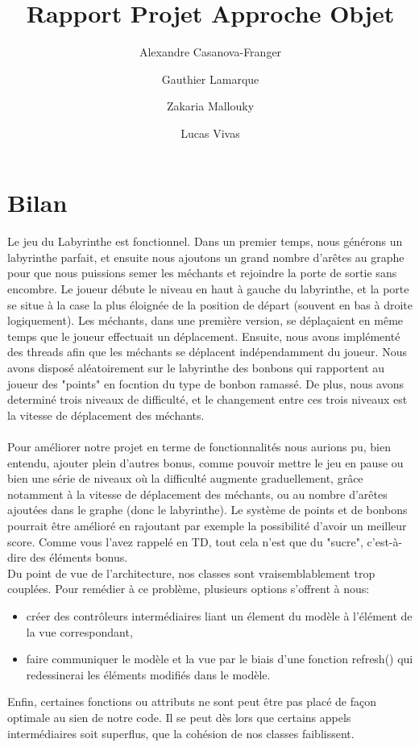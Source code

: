 \documentclass{article}
\title{Rapport Projet Approche Objet}
\author{Alexandre Casanova-Franger\\
        \and
        Gauthier Lamarque\\
        \and
        Zakaria Mallouky\\
        \and
        Lucas Vivas\\
        }
\begin{document}
  \maketitle
  \section{Bilan}
  \paragraph{}
  Le jeu du Labyrinthe est fonctionnel. Dans un premier temps, nous générons un
  labyrinthe parfait, et ensuite nous ajoutons un grand nombre d'arêtes au
  graphe pour que nous puissions semer les méchants et rejoindre la porte de
  sortie sans encombre. Le joueur débute le niveau en haut à gauche du
  labyrinthe, et la porte se situe à la case la plus éloignée de la position de
  départ (souvent en bas à droite logiquement). Les méchants, dans une première
  version, se déplaçaient en même temps que le joueur effectuait un déplacement.
  Ensuite, nous avons implémenté des threads afin que les méchants se déplacent
  indépendamment du joueur. Nous avons disposé aléatoirement sur le labyrinthe
  des bonbons qui rapportent au joueur des "points" en focntion du type de
  bonbon ramassé. De plus, nous avons determiné trois niveaux de difficulté, et le changement
  entre ces trois niveaux est la vitesse de déplacement des méchants.

  \paragraph{}
  Pour améliorer notre projet en terme de fonctionnalités nous aurions pu, bien
  entendu, ajouter plein d'autres bonus, comme pouvoir mettre le jeu en pause ou bien
   une série de niveaux où la difficulté augmente graduellement, grâce notamment à la vitesse
   de déplacement des méchants, ou au nombre d'arêtes ajoutées dans le graphe (donc le
  labyrinthe). Le système de points et de bonbons pourrait être amélioré en rajoutant
  par exemple la possibilité d'avoir un meilleur score. Comme
  vous l'avez rappelé en TD, tout cela n'est que du "sucre", c'est-à-dire des
  éléments bonus.\\
  Du point de vue de l'architecture, nos classes sont vraisemblablement trop
  couplées. Pour remédier à ce problème, plusieurs options s'offrent à nous:
  \begin{itemize}
    \item créer des contrôleurs intermédiaires liant un élement du modèle à
    l'élément de la vue correspondant,
    \item faire communiquer le modèle et la vue par le biais d'une fonction
    refresh() qui redessinerai les éléments modifiés dans le modèle.
  \end{itemize}
  Enfin, certaines fonctions ou attributs ne sont peut être pas placé de façon
  optimale au sien de notre code. Il se peut dès lors que certains appels
  intermédiaires soit superflus, que la cohésion de nos classes faiblissent.
\end{document}
